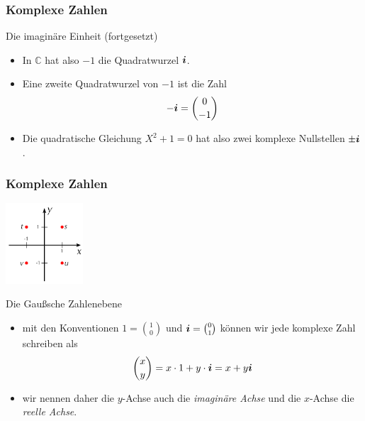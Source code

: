 \documentclass{beamer}
\def\vec#1{\mathchoice{\mbox{\boldmath$\displaystyle#1$}}
{\mbox{\boldmath$\textstyle#1$}}
{\mbox{\boldmath$\scriptstyle#1$}}
{\mbox{\boldmath$\scriptscriptstyle#1$}}}
\renewcommand{\emph}[1]{{\textcolor{solarizedRed}{\itshape #1}}}
\newcommand\ii{\vec i}
\newcommand\CC{\mathbb C}
\renewcommand{\ae}{\"a}
\renewcommand{\oe}{\"o}
\newcommand{\mytitle}{Komplexe Zahlen}
\begin{document}
\begin{frame}\frametitle{\mytitle}
	\begin{block}{Die imagin\ae re Einheit (fortgesetzt)}
		\begin{itemize}
			\item In $\CC$ hat also $-1$ die Quadratwurzel $\ii$.
			\item Eine zweite Quadratwurzel von $-1$ ist die Zahl
				\begin{align*}
					-\ii=\binom0{-1}
				\end{align*}
			\item Die quadratische Gleichung $X^2+1=0$ hat also zwei komplexe Nullstellen $\pm\ii$.
		\end{itemize}
	\end{block}
\end{frame}

\begin{frame}\frametitle{\mytitle}
	\hfill\includegraphics[height=30mm]{pics/vectors.pdf}
	\begin{block}{Die Gau\ss sche Zahlenebene}
		\begin{itemize}
			\item mit den Konventionen $1=\binom 10$ und $\ii=\binom 01$ k\oe nnen wir jede komplexe Zahl schreiben als
				\begin{align*}
				\binom xy=x\cdot 1+y\cdot\ii=x+y\ii
				\end{align*}
			\item wir nennen daher die $y$-Achse auch die \emph{imagin\ae re Achse} und die $x$-Achse die \emph{reelle Achse}.
		\end{itemize}
	\end{block}
\end{frame}
\end{document}
